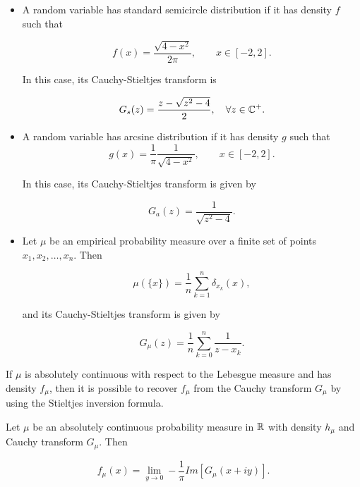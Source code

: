     \begin{example}
        \begin{itemize}
            \item A random variable has standard semicircle distribution if it has density $f$ such that
            
            \[ f(x) = \frac{\sqrt{4-x^2}}{2\pi}, \qquad x \in [-2,2]. \]

            In this case, its Cauchy-Stieltjes transform is

            \[G_s(z) = \frac{z - \sqrt{z^2-4}}{2}, \quad \forall z \in \mathbb C^+.\]
            
            \item A random variable has arcsine distribution if it has density $g$ such that
            \[ g(x) = \frac1\pi \frac{1}{\sqrt{4-x^2}}, \qquad x \in [-2,2]. \]

            In this case, its Cauchy-Stieltjes transform is given by

            \[ G_a(z) = \frac{1}{\sqrt{z^2-4}}. \]

            \item Let $\mu$ be an empirical probability measure over a finite set of points $x_1,x_2, \dots, x_n$. Then 
            
            \[ \mu(\{x\}) = \frac1n \sum_{k=1}^n \delta_{x_k}(x), \]

            \noindent and its Cauchy-Stieltjes transform is given by

            \[ G_\mu(z) = \frac1n \sum_{k=0}^n \frac{1}{z - x_k}. \]
        \end{itemize}
    \end{example}

    If $\mu$ is absolutely continuous with respect to the Lebesgue measure and has density $f_\mu$, then it is possible to recover $f_\mu$ from the Cauchy transform $G_\mu$ by using the Stieltjes inversion formula.

    \begin{theorem}
        Let $\mu$ be an absolutely continuous probability measure in $\mathbb R$ with density $h_\mu$ and Cauchy transform $G_\mu$. Then

        \begin{equation*}
            f_\mu(x) = \lim_{y \to 0} - \frac1\pi Im[G_\mu(x + iy)].
        \end{equation*}
    \end{theorem}

